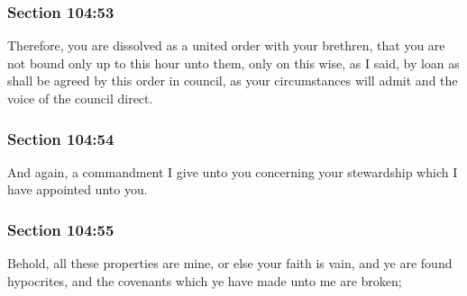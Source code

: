 	\subsubsection{Section 104:53} %
		\label{DC104-53}

		Therefore, you are dissolved as a united order with your brethren, that you are not bound only up to this hour unto them, only on this wise, as I said, by loan as shall be agreed by this order in council, as your circumstances will admit and the voice of the council direct.


	\subsubsection{Section 104:54} %
		\label{DC104-54}

		And again, a commandment I give unto you concerning your stewardship which I have appointed unto you.


	\subsubsection{Section 104:55} %
		\label{DC104-55}

		Behold, all these properties are mine, or else your faith is vain, and ye are found hypocrites, and the covenants which ye have made unto me are broken;


